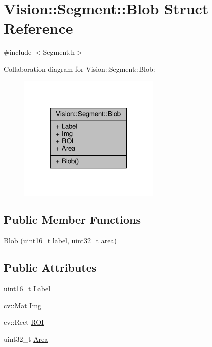 \hypertarget{struct_vision_1_1_segment_1_1_blob}{}\section{Vision\+:\+:Segment\+:\+:Blob Struct Reference}
\label{struct_vision_1_1_segment_1_1_blob}


{\ttfamily \#include $<$Segment.\+h$>$}



Collaboration diagram for Vision\+:\+:Segment\+:\+:Blob\+:\nopagebreak
\begin{figure}[H]
\begin{center}
\leavevmode
\includegraphics[width=194pt]{struct_vision_1_1_segment_1_1_blob__coll__graph}
\end{center}
\end{figure}
\subsection*{Public Member Functions}
\begin{DoxyCompactItemize}
\item 
\hyperlink{struct_vision_1_1_segment_1_1_blob_a4133b605534057e3747506d03e4041cb}{Blob} (uint16\+\_\+t label, uint32\+\_\+t area)
\end{DoxyCompactItemize}
\subsection*{Public Attributes}
\begin{DoxyCompactItemize}
\item 
uint16\+\_\+t \hyperlink{struct_vision_1_1_segment_1_1_blob_aaa4c2a0d3f0c920fb8b59417dd54f82b}{Label}
\item 
cv\+::\+Mat \hyperlink{struct_vision_1_1_segment_1_1_blob_a776f587282c775375052461a14b0a304}{Img}
\item 
cv\+::\+Rect \hyperlink{struct_vision_1_1_segment_1_1_blob_aceb3e938bb4489c08edd9324fdee7465}{R\+O\+I}
\item 
uint32\+\_\+t \hyperlink{struct_vision_1_1_segment_1_1_blob_a391697e1f49d65415c6c0ed8c3221a74}{Area}
\end{DoxyCompactItemize}


